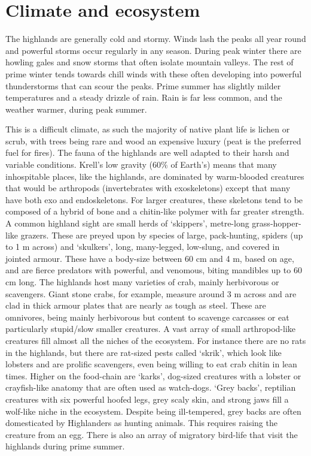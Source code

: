 \documentclass[a4paper,11pt,oneside]{book}
\begin{document}
\section{Climate and ecosystem}
The highlands are generally cold and stormy. Winds lash the peaks all year round and powerful storms occur regularly in any season. During peak winter there are howling gales and snow storms that often isolate mountain valleys. The rest of prime winter tends towards chill winds with these often developing into powerful thunderstorms that can scour the peaks. Prime summer has slightly milder temperatures and a steady drizzle of rain. Rain is far less common, and the weather warmer, during peak summer. 

This is a difficult climate, as such the majority of native plant life is lichen or scrub, with trees being rare and wood an expensive luxury (peat is the preferred fuel for fires). The fauna of the highlands are well adapted to their harsh and variable conditions. Krell's low gravity (60\% of Earth's) means that many inhospitable places, like the highlands, are dominated by warm-blooded creatures that would be arthropods (invertebrates with exoskeletons) except that many have both exo and endoskeletons. For larger creatures, these skeletons tend to be composed of a hybrid of bone and a chitin-like polymer with far greater strength. A common highland sight are small herds of `skippers', metre-long grass-hopper-like grazers. These are preyed upon by species of large, pack-hunting, spiders (up to 1 m across) and `skulkers', long, many-legged, low-slung, and covered in jointed armour. These have a body-size between 60 cm and 4 m, based on age, and are fierce predators with powerful, and venomous, biting mandibles up to 60 cm long. The highlands host many varieties of crab, mainly herbivorous or scavengers. Giant stone crabs, for example, measure around 3 m across and are clad in thick armour plates that are nearly as tough as steel. These are omnivores, being mainly herbivorous but content to scavenge carcasses or eat particularly stupid/slow smaller creatures. A vast array of small arthropod-like creatures fill almost all the niches of the ecosystem. For instance there are no rats in the highlands, but there are rat-sized pests called `skrik', which look like lobsters and are prolific scavengers, even being willing to eat crab chitin in lean times. Higher on the food-chain are `karks', dog-sized creatures with a lobster or crayfish-like anatomy that are often used as watch-dogs. `Grey backs', reptilian creatures with six powerful hoofed legs, grey scaly skin, and strong jaws fill a wolf-like niche in the ecosystem. Despite being ill-tempered, grey backs are often domesticated by Highlanders as hunting animals. This requires raising the creature from an egg. There is also an array of migratory bird-life that visit the highlands during prime summer. 
\end{document}
